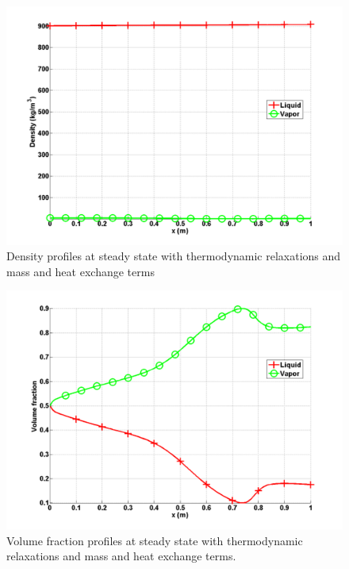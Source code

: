 %
\begin{figure}[H]
\centering
\includegraphics[width=\textwidth]{figures/SEM/Aint1e3MassOn_two_phases_density.png}
\caption{Density profiles at steady state with thermodynamic relaxations and mass and heat exchange terms}
\label{fig:two-fluids-rel-nozzle-rho-mass-on-sem-sect4}
\end{figure}
%
\begin{figure}[H]
\centering
\includegraphics[width=\textwidth]{figures/SEM/Aint1e3MassOn_two_phases_volume_fraction.png}
\caption{Volume fraction profiles at steady state with thermodynamic relaxations and mass and heat exchange terms.}
\label{fig:two-fluids-rel-nozzle-vf-mass-on-sem-sect4}
\end{figure}
%
